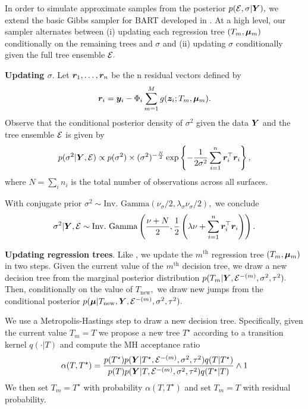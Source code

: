 
In order to simulate approximate samples from the posterior $p(\mathcal{E}, \sigma \vert \bm{Y}),$ we extend the basic Gibbs sampler for BART developed in \citet{Chipman2010}.
At a high level, our sampler alternates between (i) updating each regression tree $(T_{m}, \boldsymbol{\mu}_{m})$ conditionally on the remaining trees and $\sigma$ and (ii) updating $\sigma$ conditionally given the full tree ensemble $\mathcal{E}.$

\textbf{Updating $\sigma$}. Let $\bm{r}_{1}, \ldots, \bm{r}_{n}$ be the n residual vectors defined by
$$
\bm{r}_{i} = \bm{y}_{i} - \Phi_{i}\sum_{m = 1}^{M}{g(\bm{z}_{i}; T_{m}, \boldsymbol{\mu}_{m})}.
$$
Observe that the conditional posterior density of $\sigma^{2}$ given the data $\bm{Y}$ and the tree ensemble $\mathcal{E}$ is given by
$$
p(\sigma^{2} \vert \bm{Y}, \mathcal{E}) \propto p(\sigma^{2})\times(\sigma^{2})^{-\frac{N}{2}}\exp\left\{-\frac{1}{2\sigma^{2}}\sum_{i = 1}^{n}{\bm{r}_{i}^{\top}\bm{r}_{i}}\right\},
$$
where $N = \sum_{i}{n_{i}}$ is the total number of observations across all surfaces.

With conjugate prior $\sigma^{2} \sim \text{Inv.~Gamma}(\nu_{\sigma}/2, \lambda_{\sigma}\nu_{\sigma}/2),$ we conclude
$$
\sigma^{2} \vert \bm{Y}, \mathcal{E} \sim \text{Inv.~Gamma}\left(\frac{\nu + N}{2}, \frac{1}{2}\left(\lambda\nu + \sum_{i = 1}^{n}{\bm{r}_{i}^{\top}\bm{r}_{i}}\right)\right).
$$


\textbf{Updating regression trees}. 
Like \citet{Chipman2010}, we update the $m^{\text{th}}$ regression tree $(T_{m}, \boldsymbol{\mu}_{m})$ in two steps.
Given the current value of the $m^{\text{th}}$ decision tree, we draw a new decision tree from the marginal posterior distribution $p(T_{m} \vert \bm{Y}, \mathcal{E}^{-(m)}, \sigma^{2}, \tau^{2}).$
Then, conditionally on the value of $T_{\text{new}},$ we draw new jumps from the conditional posterior $p(\boldsymbol{\mu} \vert T_{\text{new}}, \bm{Y}, \mathcal{E}^{-(m)}, \sigma^{2}, \tau^{2}).$

We use a Metropolis-Hastings step to draw a new decision tree.
Specifically, given the current value $T_{m} = T$ we propose a new tree $T^{\star}$ according to a transition kernel $q(\cdot \vert T)$ and compute the MH acceptance ratio
\begin{equation}
\label{eq:mh_ratio}
\alpha(T, T^{\star}) = \frac{p(T^{\star})p(\bm{Y} \vert T^{\star}, \mathcal{E}^{-(m)}, \sigma^{2}, \tau^{2})q(T \vert T^{\star})}{p(T)p(\bm{Y} \vert T, \mathcal{E}^{-(m)}, \sigma^{2}, \tau^{2})q(T^{\star} \vert T)} \wedge 1
\end{equation}
We then set $T_{m} = T^{\star}$ with probability $\alpha(T, T^{\star})$ and set $T_{m} = T$ with residual probability.

